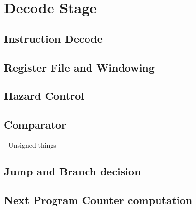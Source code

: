\chapter{Decode Stage}

\section{Instruction Decode}
\section{Register File and Windowing}
\section{Hazard Control}
\section{Comparator}
- Unsigned things 

\section{Jump and Branch decision}
\section{Next Program Counter computation}